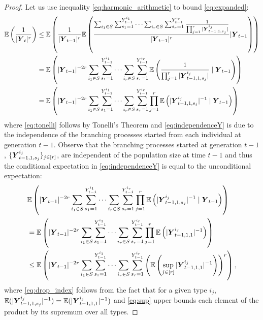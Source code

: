 \documentclass[preprint,3p,12pt]{elsarticle}
\theoremstyle{definition}
\newcommand{\Y}[1][]{%
  \ifx\relax#1\relax
    \boldsymbol{Y}_{t-1, 1, s}^{i}%
  \else
    \boldsymbol{Y}_{t-1, 1, s_{#1}}^{i_{#1}}%
  \fi
}
\begin{document}
\begin{proof}
Let us use inequality \eqref{eq:harmonic_arithmetic} to bound \eqref{eq:expanded}:
\begin{align}
\mathbb{E}\left(\frac{1}{|\boldsymbol{Y}_t|^r}\right)
&\le \mathbb{E}\left(\frac{1}{|\boldsymbol{Y}_{t-1}|^r}\mathbb{E}\left(\frac{\sum_{i_1 \in S}\sum_{s_1=1}^{Y_{t-1}^{i_1}} \dots \sum_{i_r \in S}\sum_{s_r=1}^{Y_{t-1}^{i_r}}\frac{1}{\prod_{j=1}^r|\Y[j]|}}{|\boldsymbol{Y}_{t-1}|^r}| \boldsymbol{Y}_{t-1}\right)\right) \nonumber \\
& =\mathbb{E}\left(|\boldsymbol{Y}_{t-1}|^{-2r}\sum_{i_1 \in S}\sum_{s_1=1}^{Y_{t-1}^{i_1}} \dots \sum_{i_r \in S}\sum_{s_r=1}^{Y_{t-1}^{i_r}}\mathbb{E}\left(\frac{1}{\prod_{j=1}^r|\Y[j]|} \mid \boldsymbol{Y}_{t-1}\right)\right) \label{eq:tonelli}\\ 
& =\mathbb{E}\left(|\boldsymbol{Y}_{t-1}|^{-2r}\sum_{i_1 \in S}\sum_{s_1=1}^{Y_{t-1}^{i_1}} \dots \sum_{i_r \in S}\sum_{s_r=1}^{Y_{t-1}^{i_r}}\prod_{j=1}^r\mathbb{E}\left(|\Y[j]|^{-1} \mid \boldsymbol{Y}_{t-1}\right)\right)\label{eq:independenceY}
\end{align}%
where \eqref{eq:tonelli} follows by Tonelli's Theorem and \eqref{eq:independenceY} is due to the independence of the branching processes started from each individual at generation $t-1$. Observe that the branching processes started at generation $t-1$, $\{\Y[j]\}_{j \in [r]}$, are independent of the population size at time $t-1$ and thus the conditional expectation in \eqref{eq:independenceY} is equal to the unconditional expectation:
\begin{align}
&\mathbb{E}\left(|\boldsymbol{Y}_{t-1}|^{-2r}\sum_{i_1 \in S}\sum_{s_1=1}^{Y_{t-1}^{i_1}} \dots \sum_{i_r \in S}\sum_{s_r=1}^{Y_{t-1}^{i_r}}\prod_{j=1}^r\mathbb{E}\left(|\Y[j]|^{-1} \mid \boldsymbol{Y}_{t-1}\right)\right) \nonumber\\ 
& =\mathbb{E}\left(|\boldsymbol{Y}_{t-1}|^{-2r}\sum_{i_1 \in S}\sum_{s_1=1}^{Y_{t-1}^{i_1}} \dots \sum_{i_r \in S}\sum_{s_r=1}^{Y_{t-1}^{i_r}}\prod_{j=1}^r\mathbb{E}\left(|\boldsymbol{Y}_{t-1,1,1}^{i_j}|^{-1}\right)\right) \label{eq:drop_index}\\
& \le\mathbb{E}\left(|\boldsymbol{Y}_{t-1}|^{-2r}\sum_{i_1 \in S}\sum_{s_1=1}^{Y_{t-1}^{i_1}} \dots \sum_{i_r \in S}\sum_{s_r=1}^{Y_{t-1}^{i_r}}\left(\mathbb{E}\left(\sup_{j \in [r]}|\boldsymbol{Y}_{t-1,1,1}^{i_j}|^{-1}\right)\right)^r\right), \label{eq:sup} 
\end{align}
where \eqref{eq:drop_index} follows from the fact that for a given type $i_j$, $\mathbb{E}(|\Y[j]|^{-1}) = \mathbb{E}(|\boldsymbol{Y}_{t-1,1,1}^{i_j}|^{-1})$ and \eqref{eq:sup} upper bounds each element of the product by its supremum over all types.


\end{proof}
\end{document}

